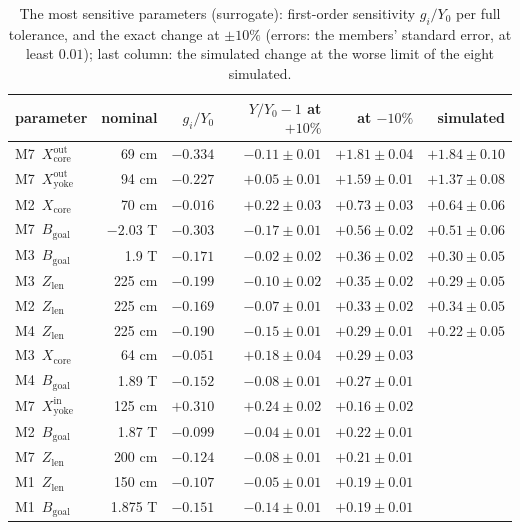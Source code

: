 \documentclass[11pt,a4paper]{article}
\begin{document}
\begin{table}[t]
\centering
\caption{The most sensitive parameters (surrogate): first-order sensitivity $g_i/Y_0$ per full
tolerance, and the exact change at $\pm10\%$ (errors: the members' standard error, at least
$0.01$); last column: the simulated change at the worse limit of the eight simulated.}
\label{tab:oat}
\small
\begin{tabular}{lrrrrr}
\toprule
parameter & nominal & $g_i/Y_0$ & $Y/Y_0-1$ at $+10\%$ & at $-10\%$ & simulated \\
\midrule
M7~$X_\mathrm{core}^\mathrm{out}$      & 69 cm    & $-0.334$ & $-0.11\pm0.01$ & $+1.81\pm0.04$ & $+1.84\pm0.10$ \\
M7~$X_\mathrm{yoke}^\mathrm{out}$  & 94 cm    & $-0.227$ & $+0.05\pm0.01$ & $+1.59\pm0.01$ & $+1.37\pm0.08$ \\
M2~$X_\mathrm{core}$       & 70 cm    & $-0.016$ & $+0.22\pm0.03$ & $+0.73\pm0.03$ & $+0.64\pm0.06$ \\
M7~$B_\mathrm{goal}$                 & $-2.03$ T & $-0.303$ & $-0.17\pm0.01$ & $+0.56\pm0.02$ & $+0.51\pm0.06$ \\
M3~$B_\mathrm{goal}$                 & 1.9 T    & $-0.171$ & $-0.02\pm0.02$ & $+0.36\pm0.02$ & $+0.30\pm0.05$ \\
M3~$Z_\mathrm{len}$     & 225 cm   & $-0.199$ & $-0.10\pm0.02$ & $+0.35\pm0.02$ & $+0.29\pm0.05$ \\
M2~$Z_\mathrm{len}$     & 225 cm   & $-0.169$ & $-0.07\pm0.01$ & $+0.33\pm0.02$ & $+0.34\pm0.05$ \\
M4~$Z_\mathrm{len}$     & 225 cm   & $-0.190$ & $-0.15\pm0.01$ & $+0.29\pm0.01$ & $+0.22\pm0.05$ \\
M3~$X_\mathrm{core}$       & 64 cm    & $-0.051$ & $+0.18\pm0.04$ & $+0.29\pm0.03$ & \\
M4~$B_\mathrm{goal}$                 & 1.89 T   & $-0.152$ & $-0.08\pm0.01$ & $+0.27\pm0.01$ & \\
M7~$X_\mathrm{yoke}^\mathrm{in}$   & 125 cm   & $+0.310$ & $+0.24\pm0.02$ & $+0.16\pm0.02$ & \\
M2~$B_\mathrm{goal}$                 & 1.87 T   & $-0.099$ & $-0.04\pm0.01$ & $+0.22\pm0.01$ & \\
M7~$Z_\mathrm{len}$     & 200 cm   & $-0.124$ & $-0.08\pm0.01$ & $+0.21\pm0.01$ & \\
M1~$Z_\mathrm{len}$     & 150 cm   & $-0.107$ & $-0.05\pm0.01$ & $+0.19\pm0.01$ & \\
M1~$B_\mathrm{goal}$                 & 1.875 T  & $-0.151$ & $-0.14\pm0.01$ & $+0.19\pm0.01$ & \\
\bottomrule
\end{tabular}
\end{table}
\end{document}
